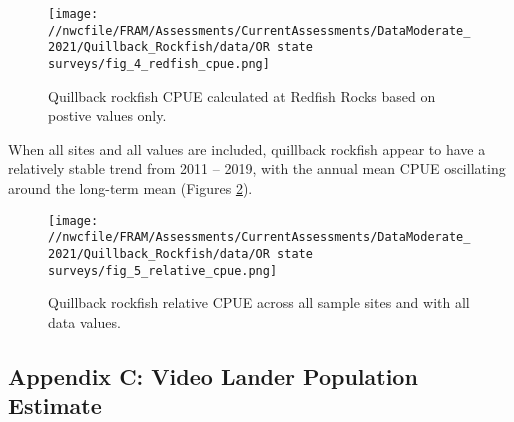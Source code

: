 \documentclass[11pt,
  english,
  a4paper,
]{article}
\begin{document}
\leavevmode\tagmcend\tagstructend\par


\begin{figure}
\centering
\texttt{[image: //nwcfile/FRAM/Assessments/CurrentAssessments/DataModerate\_2021/Quillback\_Rockfish/data/OR state surveys/fig\_4\_redfish\_cpue.png]}
\caption{Quillback rockfish CPUE calculated at Redfish Rocks based on postive values only.\label{fig:fig-4}}
\end{figure}

\tagmcend\tagstructend


When all sites and all values are included, quillback rockfish appear to have a relatively stable trend from 2011 -- 2019, with the annual mean CPUE oscillating around the long-term mean (Figures \ref{fig:fig-5}).

\leavevmode\tagmcend\tagstructend\par


\begin{figure}
\centering
\texttt{[image: //nwcfile/FRAM/Assessments/CurrentAssessments/DataModerate\_2021/Quillback\_Rockfish/data/OR state surveys/fig\_5\_relative\_cpue.png]}
\caption{Quillback rockfish relative CPUE across all sample sites and with all data values.\label{fig:fig-5}}
\end{figure}

\tagmcend\tagstructend

\clearpage


\hypertarget{appendix-c-video-lander-population-estimate}{%
\subsection{Appendix C: Video Lander Population Estimate}\label{appendix-c-video-lander-population-estimate}}

\leavevmode\tagmcend\tagstructend

\end{document}
